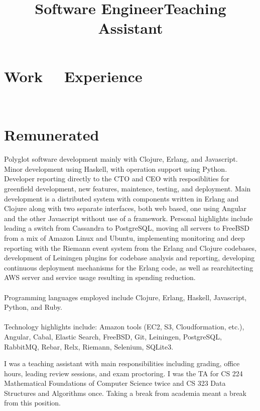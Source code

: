 \documentclass[margintitle,line]{res}
\renewcommand{\subsection}[1]{\section{\normalfont #1}}
\begin{document}
\begin{resume}
\section{Work \ \ Experience}
\ \\
\subsection{Remunerated}

\title{Software Engineer}
\begin{position}
  Polyglot software development mainly with Clojure, Erlang, and Javascript.
  Minor development using Haskell, with operation support using Python.
  Developer reporting directly to the CTO and CEO with resposiblities for greenfield
  development, new features, maintence, testing, and deployment. Main development is
  a distributed system with components written in Erlang and Clojure along with two separate
  interfaces, both web based, one using Angular and the other Javascript without use of a framework.
  Personal highlights include leading a switch from Cassandra to PostgreSQL,
  moving all servers to FreeBSD from a mix of Amazon Linux and Ubuntu, implementing
  monitoring and deep reporting with the Riemann event system from the Erlang
  and Clojure codebases, development of Leiningen plugins for codebase analysis and reporting,
  developing continuous deployment mechanisms for the Erlang code,
  as well as rearchitecting AWS server and service usage resulting in spending reduction.\\ \ \\
 Programming languages employed include Clojure, Erlang, Haskell, Javascript,
 Python, and Ruby. \\ \ \\
 Technology highlights include: Amazon tools (EC2, S3, Cloudformation, etc.),
 Angular, Cabal, Elastic Search, FreeBSD, Git, Leiningen, PostgreSQL, RabbitMQ,
 Rebar, Relx, Riemann, Selenium, SQLite3.
\end{position}

\title{Teaching Assistant}
\begin{position}
 I was a teaching assistant with main responsibilities including
 grading, office hours, leading review sessions, and exam
 proctoring. I was the TA for CS 224 Mathematical Foundations of
 Computer Science twice and CS 323 Data Structures and Algorithms
 once. Taking a break from academia meant a break from this position.
\end{position}


\end{resume}
\end{document}
